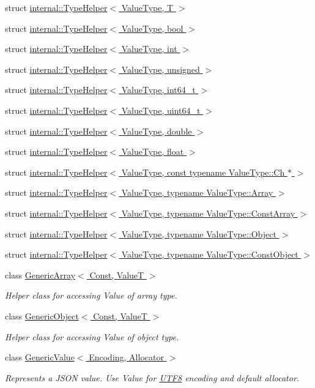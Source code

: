 \begin{DoxyCompactItemize}
struct \hyperlink{a00310}{internal\+::\+Type\+Helper$<$ Value\+Type, T $>$}
\item 
struct \hyperlink{a00311}{internal\+::\+Type\+Helper$<$ Value\+Type, bool $>$}
\item 
struct \hyperlink{a00315}{internal\+::\+Type\+Helper$<$ Value\+Type, int $>$}
\item 
struct \hyperlink{a00322}{internal\+::\+Type\+Helper$<$ Value\+Type, unsigned $>$}
\item 
struct \hyperlink{a00316}{internal\+::\+Type\+Helper$<$ Value\+Type, int64\+\_\+t $>$}
\item 
struct \hyperlink{a00321}{internal\+::\+Type\+Helper$<$ Value\+Type, uint64\+\_\+t $>$}
\item 
struct \hyperlink{a00313}{internal\+::\+Type\+Helper$<$ Value\+Type, double $>$}
\item 
struct \hyperlink{a00314}{internal\+::\+Type\+Helper$<$ Value\+Type, float $>$}
\item 
struct \hyperlink{a00312}{internal\+::\+Type\+Helper$<$ Value\+Type, const typename Value\+Type\+::\+Ch $\ast$ $>$}
\item 
struct \hyperlink{a00317}{internal\+::\+Type\+Helper$<$ Value\+Type, typename Value\+Type\+::\+Array $>$}
\item 
struct \hyperlink{a00318}{internal\+::\+Type\+Helper$<$ Value\+Type, typename Value\+Type\+::\+Const\+Array $>$}
\item 
struct \hyperlink{a00320}{internal\+::\+Type\+Helper$<$ Value\+Type, typename Value\+Type\+::\+Object $>$}
\item 
struct \hyperlink{a00319}{internal\+::\+Type\+Helper$<$ Value\+Type, typename Value\+Type\+::\+Const\+Object $>$}
\item 
class \hyperlink{a00114}{Generic\+Array$<$ Const, Value\+T $>$}
\begin{DoxyCompactList}\small\item\em Helper class for accessing Value of array type. \end{DoxyCompactList}\item 
class \hyperlink{a00120}{Generic\+Object$<$ Const, Value\+T $>$}
\begin{DoxyCompactList}\small\item\em Helper class for accessing Value of object type. \end{DoxyCompactList}\item 
class \hyperlink{a00130}{Generic\+Value$<$ Encoding, Allocator $>$}
\begin{DoxyCompactList}\small\item\em Represents a J\+S\+ON value. Use Value for \hyperlink{a00333}{U\+T\+F8} encoding and default allocator. \end{DoxyCompactList}\item 

\end{DoxyCompactItemize}
